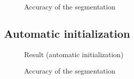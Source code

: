  \begin{figure} \centering
  \caption{Accuracy of the segmentation}
\end{figure}


\subsection{Automatic initialization}

 \begin{figure} \centering
  \caption{Result (automatic initialization)}
\end{figure}

 \begin{figure} \centering
  \caption{Accuracy of the segmentation}
\end{figure}

